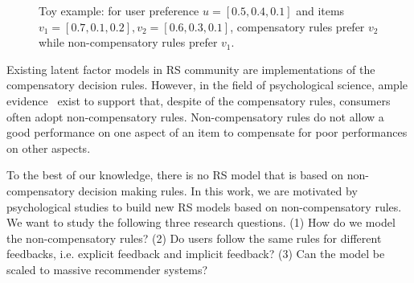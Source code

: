 \documentclass[conference]{IEEEtran}
\begin{document}
\begin{figure}[htbp]
\begin{center}
\caption{Toy example: for user preference $u=[0.5,0.4,0.1]$ and items $v_1=[0.7,0.1,0.2],v_2=[0.6,0.3,0.1]$, compensatory rules prefer $v_2$ while non-compensatory rules prefer $v_1$. }
\label{default}
\end{center}
\end{figure}

Existing latent factor models in RS community are implementations of the compensatory decision rules. However, in the field of psychological science, ample evidence~\cite{Engel1986Consumer} exist to support that, despite of the compensatory rules, consumers often adopt non-compensatory rules. Non-compensatory rules do not allow a good performance on one aspect of an item to compensate for poor performances on other aspects. 



To the best of our knowledge, there is no RS model that is based on non-compensatory decision making rules.
In this work, we are motivated by psychological studies to build new RS models based on non-compensatory rules. We want to study the following three research questions. (1) How do we model the non-compensatory rules? (2) Do users follow the same rules for different feedbacks, i.e. explicit feedback and implicit feedback? (3) Can the model be scaled to massive recommender systems?
  
\end{document}
